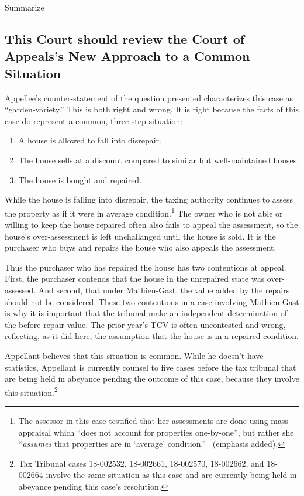 \documentclass[12pt,\documentclassflag]{michiganCourtOfAppealsBrief}
\begin{document}
Summarize

\subsection{This Court should review the Court of Appeals's New Approach to a Common Situation}

Appellee's counter-statement of the question presented characterizes this case as ``garden-variety.'' This is both right and wrong. It is right because the facts of this case do represent a common, three-step situation:

\begin{enumerate}
\item A house is allowed to fall into disrepair.
\item The house sells at a discount compared to similar but well-maintained houses.
\item The house is bought and repaired.
\end{enumerate}

While the house is falling into disrepair, the taxing authority continues to assess the property as if it were in average condition.\footnote{The assessor in this case testified that her assessments are done using mass appraisal which ``does not account for properties one-by-one'', but rather she ``{\em assumes} that properties are in `average' condition.'' \ (emphasis added).} The owner who is not able or willing to keep the house repaired often also fails to appeal the assessment, so the house's over-assessment is left unchallanged until the house is sold. It is the purchaser who buys and repairs the house who also appeals the assessment.

Thus the purchaser who has repaired the house has two contentions at appeal. First, the purchaser contends that the house in the unrepaired state was over-assessed. And second, that under Mathieu-Gast, the value added by the repairs should not be considered. These two contentions in a case involving Mathieu-Gast is why it is important that the tribunal make an independent determination of the before-repair value. The prior-year's TCV is often uncontested and wrong, reflecting, as it did here, the assumption that the house is in a repaired condition.


Appellant believes that this situation is common. While he doesn't have statistics, Appellant is currently counsel to five cases before the tax tribunal that are being held in abeyance pending the outcome of this case, because they involve this situation.\footnote{Tax Tribunal cases 18-002532, 18-002661, 18-002570, 18-002662, and 18-002664 involve the same situation as this case and are currently being held in abeyance pending this case's resolution.}
\end{document}
